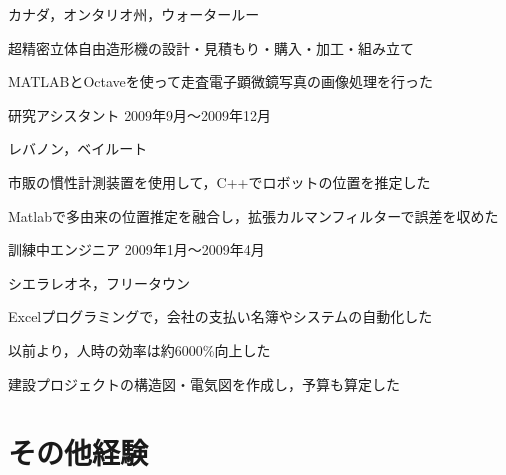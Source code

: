 \documentclass[10pt, a4paper]{article}
\begin{document}
\begin{outerlist}
\vspace{-2\baselineskip}
\hfill カナダ，オンタリオ州，ウォータールー
  \begin{innerlist}
  \item 超精密立体自由造形機の設計・見積もり・購入・加工・組み立て
  \item MATLABとOctaveを使って走査電子顕微鏡写真の画像処理を行った
  \end{innerlist}

\item[\href{http://www.aub.edu.lb/fea/me/research_labs/cvl/Pages/home.aspx}{\parbox[t]{3cm}{\raggedleft ベイルート・\\アメリカン大学\\移動ロボット研究室}}]{研究アシスタント} \hfill {2009年9月〜2009年12月}

\vspace{-2\baselineskip}
\hfill レバノン，ベイルート
  \begin{innerlist}
  \item 市販の慣性計測装置を使用して，C++でロボットの位置を推定した
  \item Matlabで多由来の位置推定を融合し，拡張カルマンフィルターで誤差を収めた
  \end{innerlist}

\item[{\parbox[t]{3cm}{\raggedleft Sierra Construction Systems有限会社}}]{訓練中エンジニア} \hfill {2009年1月〜2009年4月}

\vspace{-\baselineskip}
\hfill シエラレオネ，フリータウン
  \begin{innerlist}
  \item Excelプログラミングで，会社の支払い名簿やシステムの自動化した
  \item 以前より，人時の効率は約6000\%向上した
  \item 建設プロジェクトの構造図・電気図を作成し，予算も算定した
  \end{innerlist}

\end{outerlist}

\section{その他経験}
\end{document}
